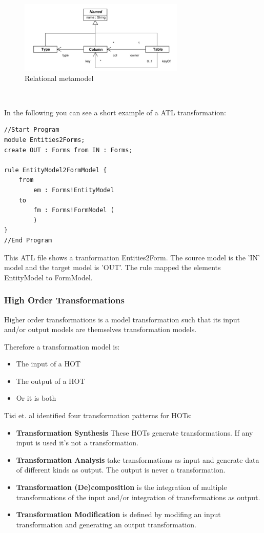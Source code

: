 \documentclass{llncs}
\begin{document}
\begin{figure}
	\centering
	\includegraphics[width=0.7\textwidth,natwidth=610,natheight=642]{figures/Relational_metamodel.jpg}
	\caption{Relational metamodel}
	\label{fig:relational_metamodel_atl}
\end{figure}~\cite{atl:frederic}

In the following you can see a short example of a ATL transformation:
\begin{verbatim}
//Start Program
module Entities2Forms;
create OUT : Forms from IN : Forms;

rule EntityModel2FormModel {
	from
		em : Forms!EntityModel
	to 
		fm : Forms!FormModel (
		)
}
//End Program
\end{verbatim}

This ATL file shows a tranformation Entities2Form. The source model is the 'IN'
model and the target model is 'OUT'. The rule mapped the elements EntityModel to
FormModel. 


\subsubsection{High Order Transformations}

Higher order transformations is a model transformation such that its input and/or output models are themselves transformation models.\cite{Tisi:2009}

Therefore a transformation model is:

\begin{itemize}
	\item The input of a HOT
	\item The output of a HOT
	\item Or it is both
\end{itemize}

Tisi et. al identified four transformation patterns for HOTs:

\begin{itemize}
	\item \textbf{Transformation Synthesis} These HOTs generate transformations. If any input is used it's not a transformation.
	\item \textbf{Transformation Analysis} take transformations as input and generate data of different kinds as output. The output is never a transformation.
	\item \textbf{Transformation (De)composition} is the integration of multiple transformations of the input and/or integration of transformations as output.
	\item \textbf{Transformation Modification} is defined by modifing an input transformation and generating an output transformation.
\end{itemize}
\end{document}
